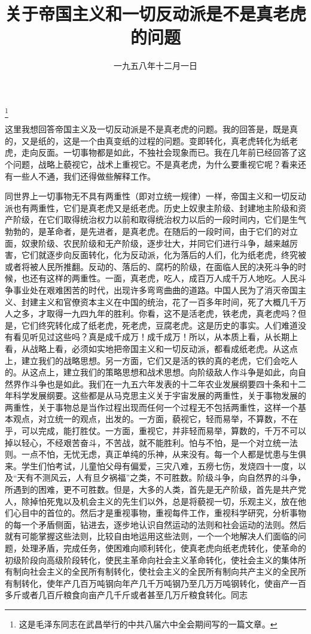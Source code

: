 
\title{关于帝国主义和一切反动派是不是真老虎的问题}
\date{一九五八年十二月一日}
\thanks{这是毛泽东同志在武昌举行的中共八届六中全会期间写的一篇文章。}
\maketitle


这里我想回答帝国主义及一切反动派是不是真老虎的问题。我的回答是，既是真的，又是纸的，这是一个由真变纸的过程的问题。变即转化，真老虎转化为纸老虎，走向反面。一切事物都是如此，不独社会现象而已。我在几年前已经回答了这个问题，战略上藐视它，战术上重视它。不是真老虎，为什么要重视它呢？看来还有一些人不通，我们还得做些解释工作。

同世界上一切事物无不具有两重性（即对立统一规律）一样，帝国主义和一切反动派也有两重性，它们是真老虎又是纸老虎。历史上奴隶主阶级、封建地主阶级和资产阶级，在它们取得统治权力以前和取得统治权力以后的一段时间内，它们是生气勃勃的，是革命者，是先进者，是真老虎。在随后的一段时间，由于它们的对立面，奴隶阶级、农民阶级和无产阶级，逐步壮大，并同它们进行斗争，越来越厉害，它们就逐步向反面转化，化为反动派，化为落后的人们，化为纸老虎，终究被或者将被人民所推翻。反动的、落后的、腐朽的阶级，在面临人民的决死斗争的时候，也还有这样的两重性。一面，真老虎，吃人，成百万人成千万人地吃。人民斗争事业处在艰难困苦的时代，出现许多弯弯曲曲的道路。中国人民为了消灭帝国主义、封建主义和官僚资本主义在中国的统治，花了一百多年时间，死了大概几千万人之多，才取得一九四九年的胜利。你看，这不是活老虎，铁老虎，真老虎吗？但是，它们终究转化成了纸老虎，死老虎，豆腐老虎。这是历史的事实。人们难道没有看见听见过这些吗？真是成千成万！成千成万！所以，从本质上看，从长期上看，从战略上看，必须如实地把帝国主义和一切反动派，都看成纸老虎。从这点上，建立我们的战略思想。另一方面，它们又是活的铁的真的老虎，它们会吃人的。从这点上，建立我们的策略思想和战术思想。向阶级敌人作斗争是如此，向自然界作斗争也是如此。我们在一九五六年发表的十二年农业发展纲要四十条和十二年科学发展纲要。这些都是从马克思主义关于宇宙发展的两重性，关于事物发展的两重性，关于事物总是当作过程出现而任何一个过程无不包括两重性，这样一个基本观点，对立统一的观点，出发的。一方面，藐视它，轻而易举，不算数，不在乎，可以完成，能打胜仗。一方面，重视它，并非轻而易举，算数的，千万不可以掉以轻心，不经艰苦奋斗，不苦战，就不能胜利。怕与不怕，是一个对立统一法则。一点不怕，无忧无虑，真正单纯的乐神，从来没有。每一个人都是忧患与生俱来。学生们怕考试，儿童怕父母有偏爱，三灾八难，五痨七伤，发烧四十一度，以及“天有不测风云，人有旦夕祸福”之类，不可胜数。阶级斗争，向自然界的斗争，所遇到的困难，更不可胜数。但是，大多的人类，首先是无产阶级，首先是共产党人，除掉怕死鬼以及机会主义的先生们以外，总是将藐视一切，乐观主义，放在他们心目中的首位的。然后才是重视事物，重视每件工作，重视科学研究，分析事物的每一个矛盾侧面，钻进去，逐步地认识自然运动的法则和社会运动的法则。然后就有可能掌握这些法则，比较自由地运用这些法则，一个一个地解决人们面临的问题，处理矛盾，完成任务，使困难向顺利转化，使真老虎向纸老虎转化，使革命的初级阶段向高级阶段转化，使民主革命向社会主义革命转化，使社会主义的集体所有制向社会主义的全民所有制转化，使社会主义的全民所有制向共产主义的全民所有制转化，使年产几百万吨钢向年产几千万吨钢乃至几万万吨钢转化，使亩产一百多斤或者几百斤粮食向亩产几千斤或者甚至几万斤粮食转化。同志